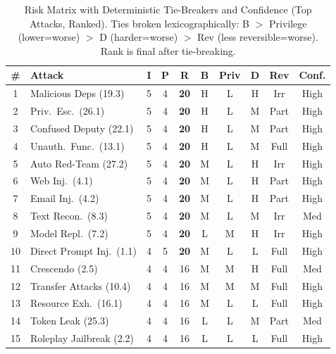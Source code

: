 \documentclass[conference]{IEEEtran}
\newcommand{\tableheaderrow}{\rowcolor{accentblue}}
\renewcommand{\thead}[1]{\textbf{\color{white}\sffamily #1}}
\begin{document}
\begin{table}[!htbp]
\centering
\caption{Risk Matrix with Deterministic Tie-Breakers and Confidence (Top Attacks, Ranked). Ties broken lexicographically: B $>$ Privilege (lower=worse) $>$ D (harder=worse) $>$ Rev (less reversible=worse). Rank is final after tie-breaking.}
\label{tab:risk_matrix}
\renewcommand{\arraystretch}{1.15}
\scriptsize\sffamily
\begin{tabular}{cp{2.0cm}cccccccc}
\toprule
\tableheaderrow \thead{\#} & \thead{Attack} & \thead{I} & \thead{P} & \thead{R} & \thead{B} & \thead{Priv} & \thead{D} & \thead{Rev} & \thead{Conf.} \\
\toprule
\rowcolor{critred!8} 1 & Malicious Deps (19.3) & 5 & 4 & \textbf{20} & H & L & H & Irr & High \\
\rowcolor{critred!8} 2 & Priv.\ Esc.\ (26.1) & 5 & 4 & \textbf{20} & H & L & M & Part & High \\
\rowcolor{critred!8} 3 & Confused Deputy (22.1) & 5 & 4 & \textbf{20} & H & L & M & Part & High \\
\rowcolor{critred!8} 4 & Unauth.\ Func.\ (13.1) & 5 & 4 & \textbf{20} & H & L & M & Full & High \\
\rowcolor{critred!8} 5 & Auto Red-Team (27.2) & 5 & 4 & \textbf{20} & M & L & H & Irr & High \\
\rowcolor{critred!8} 6 & Web Inj.\ (4.1) & 5 & 4 & \textbf{20} & M & L & H & Part & High \\
\rowcolor{critred!8} 7 & Email Inj.\ (4.2) & 5 & 4 & \textbf{20} & M & L & H & Part & High \\
\rowcolor{critred!8} 8 & Text Recon.\ (8.3) & 5 & 4 & \textbf{20} & M & L & M & Irr & Med \\
\rowcolor{critred!8} 9 & Model Repl.\ (7.2) & 5 & 4 & \textbf{20} & L & M & H & Irr & High \\
\rowcolor{critred!8} 10 & Direct Prompt Inj.\ (1.1) & 4 & 5 & \textbf{20} & M & L & L & Full & High \\
\midrule
\rowcolor{orange!8} 11 & Crescendo (2.5) & 4 & 4 & 16 & M & M & H & Full & Med \\
\rowcolor{orange!8} 12 & Transfer Attacks (10.4) & 4 & 4 & 16 & M & M & M & Full & High \\
\rowcolor{orange!8} 13 & Resource Exh.\ (16.1) & 4 & 4 & 16 & M & L & L & Full & High \\
\rowcolor{orange!8} 14 & Token Leak (25.3) & 4 & 4 & 16 & L & L & M & Part & Med \\
\rowcolor{orange!8} 15 & Roleplay Jailbreak (2.2) & 4 & 4 & 16 & L & L & L & Full & High \\

\end{tabular}
\end{table}
\end{document}
